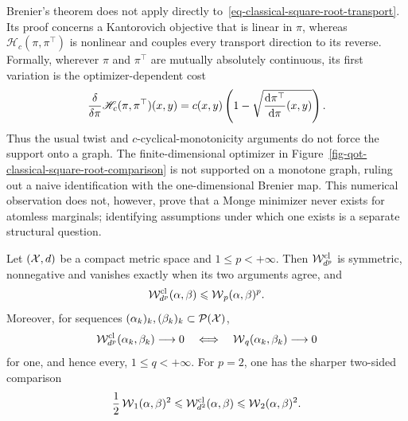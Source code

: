 \begin{rem}
	Brenier's theorem does not apply directly to~\eqref{eq-classical-square-root-transport}. Its proof concerns a Kantorovich objective that is linear in $\pi$, whereas $\mathscr H_c(\pi,\pi^\top)$ is nonlinear and couples every transport direction to its reverse. Formally, wherever $\pi$ and $\pi^\top$ are mutually absolutely continuous, its first variation is the optimizer-dependent cost
	\[
		\frac{\delta}{\delta\pi}\mathscr H_c(\pi,\pi^\top)(x,y)
		=
		c(x,y)\left(1-\sqrt{\frac{\mathrm{d}\pi^\top}{\mathrm{d}\pi}(x,y)}\right).
	\]
	Thus the usual twist and $c$-cyclical-monotonicity arguments do not force the support onto a graph. The finite-dimensional optimizer in Figure~\ref{fig-qot-classical-square-root-comparison} is not supported on a monotone graph, ruling out a naive identification with the one-dimensional Brenier map. This numerical observation does not, however, prove that a Monge minimizer never exists for atomless marginals; identifying assumptions under which one exists is a separate structural question.
\end{rem}

\begin{prop}\label{prop-classical-square-root-wasserstein-comparison}
	Let $(\mathcal{X},d)$ be a compact metric space and $1\leq p<+\infty$. Then $\mathcal W_{d^p}^{\mathrm{cl}}$ is symmetric, nonnegative and vanishes exactly when its two arguments agree, and
	\[
		\mathcal W_{d^p}^{\mathrm{cl}}(\alpha,\beta)
		\leqslant \operatorname{\mathcal{W}}_p(\alpha,\beta)^p.
	\]
	Moreover, for sequences $(\alpha_k)_k,(\beta_k)_k\subset\mathcal{P}(\mathcal{X})$,
	\[
		\mathcal W_{d^p}^{\mathrm{cl}}(\alpha_k,\beta_k)\longrightarrow0
		\quad\Longleftrightarrow\quad
		\operatorname{\mathcal{W}}_q(\alpha_k,\beta_k)\longrightarrow0
	\]
	for one, and hence every, $1\leq q<+\infty$. For $p=2$, one has the sharper two-sided comparison
	\begin{equation}\label{eq-classical-square-root-wasserstein-bounds}
		\frac12\operatorname{\mathcal{W}}_1(\alpha,\beta)^2
		\leqslant
		\mathcal W_{d^2}^{\mathrm{cl}}(\alpha,\beta)
		\leqslant
		\operatorname{\mathcal{W}}_2(\alpha,\beta)^2.
	\end{equation}
\end{prop}

